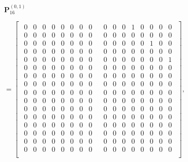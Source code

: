 \documentclass{jtacs}
\numberwithin{equation}{section}
\begin{document}
\begin{center}
$\mathbf{P}_{16}^{(0,1)}$
\begin{adjustbox}{width=0.55\textwidth, margin= 0 0}
$
=\left[
\begin{array}{cc}
\begin{matrix}
0 & 0 & 0 & 0 & 0 & 0 & 0 & 0 \\
0 & 0 & 0 & 0 & 0 & 0 & 0 & 0 \\
0 & 0 & 0 & 0 & 0 & 0 & 0 & 0 \\
0 & 0 & 0 & 0 & 0 & 0 & 0 & 0 \\
0 & 0 & 0 & 0 & 0 & 0 & 0 & 0 \\
0 & 0 & 0 & 0 & 0 & 0 & 0 & 0 \\
0 & 0 & 0 & 0 & 0 & 0 & 0 & 0 \\
0 & 0 & 0 & 0 & 0 & 0 & 0 & 0 \\
0 & 0 & 0 & 0 & 0 & 0 & 0 & 0 \\
0 & 0 & 0 & 0 & 0 & 0 & 0 & 0 \\
0 & 0 & 0 & 0 & 0 & 0 & 0 & 0 \\
0 & 0 & 0 & 0 & 0 & 0 & 0 & 0 \\
0 & 0 & 0 & 0 & 0 & 0 & 0 & 0 \\
0 & 0 & 0 & 0 & 0 & 0 & 0 & 0 \\
0 & 0 & 0 & 0 & 0 & 0 & 0 & 0 \\
0 & 0 & 0 & 0 & 0 & 0 & 0 & 0 \\
\end{matrix}
&
\begin{matrix}
0 & 0 & 0 & 1 & 0 & 0 & 0 & 0 \\
0 & 0 & 0 & 0 & 0 & 0 & 0 & 0 \\
0 & 0 & 0 & 0 & 0 & 1 & 0 & 0 \\
0 & 0 & 0 & 0 & 0 & 0 & 0 & 0 \\
0 & 0 & 0 & 0 & 0 & 0 & 0 & 1 \\
0 & 0 & 0 & 0 & 0 & 0 & 0 & 0 \\
0 & 0 & 0 & 0 & 0 & 0 & 0 & 0 \\
0 & 0 & 0 & 0 & 0 & 0 & 0 & 0 \\
0 & 0 & 0 & 0 & 0 & 0 & 0 & 0 \\
0 & 0 & 0 & 0 & 0 & 0 & 0 & 0 \\
0 & 0 & 0 & 0 & 0 & 0 & 0 & 0 \\
0 & 0 & 0 & 0 & 0 & 0 & 0 & 0 \\
0 & 0 & 0 & 0 & 0 & 0 & 0 & 0 \\
0 & 0 & 0 & 0 & 0 & 0 & 0 & 0 \\
0 & 0 & 0 & 0 & 0 & 0 & 0 & 0 \\
0 & 0 & 0 & 0 & 0 & 0 & 0 & 0 \\
\end{matrix}
\end{array}
\right],
$
\end{adjustbox}\end{center}
\end{document}
